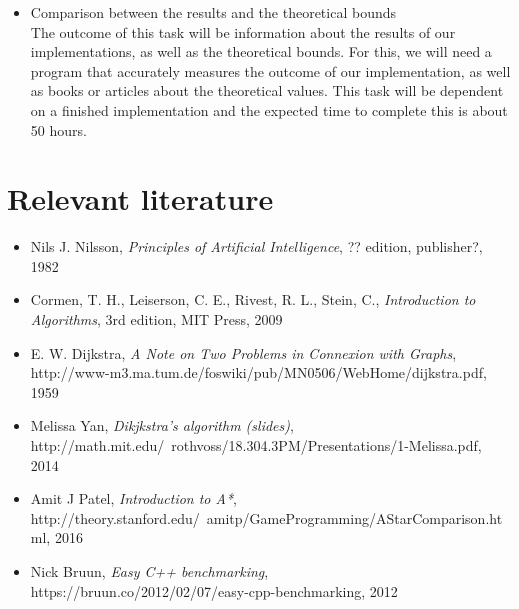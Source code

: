 \documentclass[11pt]{article}
\begin{document}
\begin{itemize}
\item Comparison between the results and the theoretical bounds\\
The outcome of this task will be information about the results of our implementations, as well as the theoretical bounds. For this, we will need a program that accurately measures the outcome of our implementation, as well as books or articles about the theoretical values. This task will be dependent on a finished implementation and the expected time to complete this is about 50 hours.

\end{itemize}

\section{Relevant literature}
\begin{itemize}
\item Nils J. Nilsson, \textit{Principles of Artificial Intelligence}, ?? edition, publisher?, 1982

\item Cormen, T. H., Leiserson, C. E., Rivest, R. L., Stein, C., \textit{Introduction to Algorithms}, 3rd edition, MIT Press, 2009

\item E. W. Dijkstra, \textit{A Note on Two Problems in Connexion with Graphs}, \\ http://www-m3.ma.tum.de/foswiki/pub/MN0506/WebHome/dijkstra.pdf, 1959

\item Melissa Yan, \textit{Dikjkstra's algorithm (slides)}, \\ http://math.mit.edu/~rothvoss/18.304.3PM/Presentations/1-Melissa.pdf, 2014

\item Amit J Patel, \textit{Introduction to A*}, \\ http://theory.stanford.edu/~amitp/GameProgramming/AStarComparison.html, 2016

\item Nick Bruun, \textit{Easy C++ benchmarking}, \\ https://bruun.co/2012/02/07/easy-cpp-benchmarking, 2012

\end{itemize}
\end{document}
